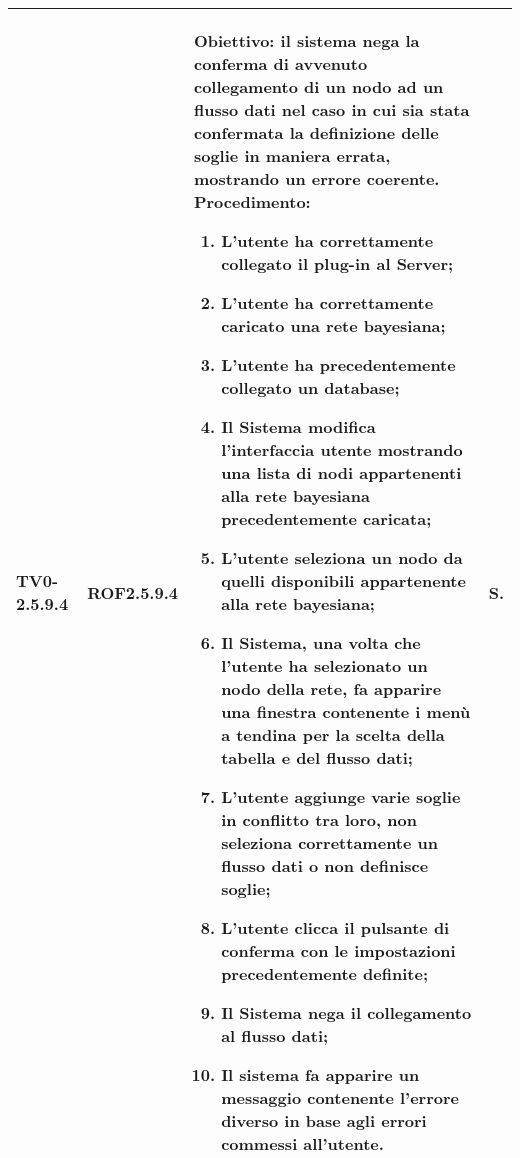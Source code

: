 \begin{longtable}{|C{.15\textwidth}|C{.13\textwidth}|m{.65\textwidth}|C{.08\textwidth}|}
\fi

TV0-2.5.9.4 & ROF2.5.9.4  &
	\textbf{Obiettivo}: il sistema nega la conferma di avvenuto collegamento di un nodo ad un flusso dati nel caso in cui sia stata confermata la definizione delle soglie in maniera errata, mostrando un errore coerente. \newline
	\textbf{Procedimento}:
	\begin{enumerate}
		\item L'utente ha correttamente collegato il plug-in al Server;
		\item L'utente ha correttamente caricato una rete bayesiana;
		\item L'utente ha precedentemente collegato un database;
		\item Il Sistema modifica l'interfaccia utente mostrando una lista di nodi appartenenti alla rete bayesiana precedentemente caricata;
		\item L'utente seleziona un nodo da quelli disponibili appartenente alla rete bayesiana;
		\item Il Sistema, una volta che l'utente ha selezionato un nodo della rete, fa apparire una finestra contenente i menù a tendina per la scelta della tabella e del flusso dati;
		\item L'utente aggiunge varie soglie in conflitto tra loro, non seleziona correttamente un flusso dati o non definisce soglie;
		\item L'utente clicca il pulsante di conferma con le impostazioni precedentemente definite;
		\item Il Sistema nega il collegamento al flusso dati;
		\item Il sistema fa apparire un messaggio contenente l'errore diverso in base agli errori commessi all'utente.
	\end{enumerate}
	& S. \\
\hline


\end{longtable}
